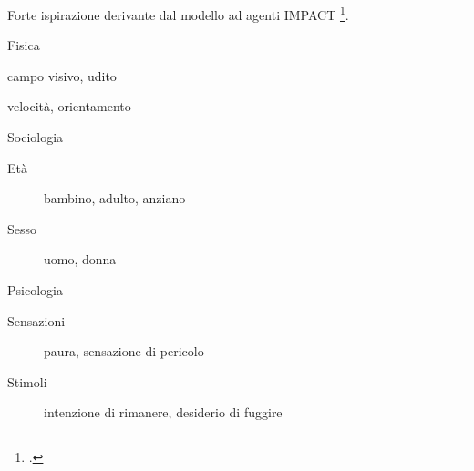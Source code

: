Forte ispirazione derivante dal modello ad agenti IMPACT \footcite{vanderWal2017}.

\begin{block}{Fisica}
    \begin{description}
        \item[Sfere sensoriali] campo visivo, udito
        \item[Movimento] velocità, orientamento
    \end{description}
\end{block}

\begin{block}{Sociologia}
    \begin{description}
        \item[Età] bambino, adulto, anziano
        \item[Sesso] uomo, donna
    \end{description}
\end{block}

\begin{block}{Psicologia}
    \begin{description}
        \item[Sensazioni] paura, sensazione di pericolo
        \item[Stimoli] intenzione di rimanere, desiderio di fuggire
    \end{description}
\end{block}